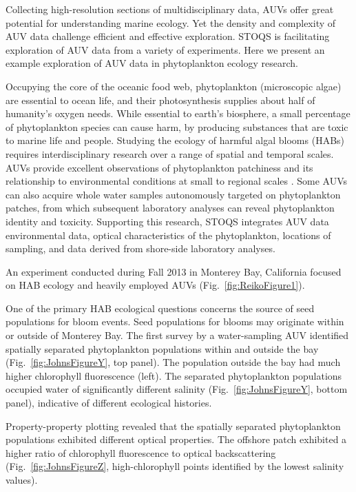 \documentclass[conference]{IEEEtran}
\begin{document}
Collecting high-resolution sections of multidisciplinary data, AUVs offer great potential for understanding marine ecology.  Yet the density and complexity of AUV data challenge efficient and effective exploration.  STOQS is facilitating exploration of AUV data from a variety of experiments.  Here we present an example exploration of AUV data in phytoplankton ecology research.

Occupying the core of the oceanic food web, phytoplankton (microscopic algae) are essential to ocean life, and their photosynthesis supplies about half of humanity’s oxygen needs.  While essential to earth’s biosphere, a small percentage of phytoplankton species can cause harm, by producing substances that are toxic to marine life and people.  Studying the ecology of harmful algal blooms (HABs) requires interdisciplinary research over a range of spatial and temporal scales. AUVs provide excellent observations of phytoplankton patchiness and its relationship to environmental conditions at small to regional scales \cite{Scholin2000}.  Some AUVs can also acquire whole water samples autonomously targeted on phytoplankton patches, from which subsequent laboratory analyses can reveal phytoplankton identity and toxicity.  Supporting this research, STOQS integrates AUV data environmental data, optical characteristics of the phytoplankton, locations of sampling, and data derived from shore-side laboratory analyses.

An experiment conducted during Fall 2013 in Monterey Bay, California focused on HAB ecology and heavily employed AUVs (Fig.~\ref{fig:ReikoFigure1}).  

One of the primary HAB ecological questions concerns the source of seed populations for bloom events.  Seed populations for blooms may originate within or outside of Monterey Bay.  The first survey by a water-sampling AUV identified spatially separated phytoplankton populations within and outside the bay (Fig.~\ref{fig:JohnsFigureY}, top panel).  The population outside the bay had much higher chlorophyll fluorescence (left).  The separated phytoplankton populations occupied water of significantly different salinity (Fig.~\ref{fig:JohnsFigureY}, bottom panel), indicative of different ecological histories.

Property-property plotting revealed that the spatially separated phytoplankton populations exhibited different optical properties.  The offshore patch exhibited a higher ratio of chlorophyll fluorescence to optical backscattering (Fig.~\ref{fig:JohnsFigureZ}, high-chlorophyll points identified by the lowest salinity values).
\end{document}
